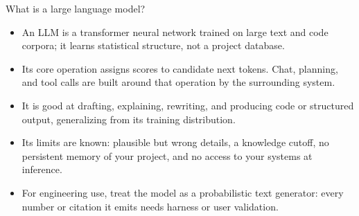 \documentclass[aspectratio=169,11pt]{beamer}
\begin{document}
\begin{frame}[t,fragile]{What is a large language model?}
\fontsize{11.5}{14}\selectfont
\begin{itemize}\setlength{\itemsep}{2mm}
\item An LLM is a transformer neural network trained on large text and code corpora; it learns statistical structure, not a project database.
\item Its core operation assigns scores to candidate next tokens. Chat, planning, and tool calls are built around that operation by the surrounding system.
\item It is good at drafting, explaining, rewriting, and producing code or structured output, generalizing from its training distribution.
\item Its limits are known: plausible but wrong details, a knowledge cutoff, no persistent memory of your project, and no access to your systems at inference.
\item For engineering use, treat the model as a probabilistic text generator: every number or citation it emits needs harness or user validation.
\end{itemize}
\end{frame}
\end{document}
